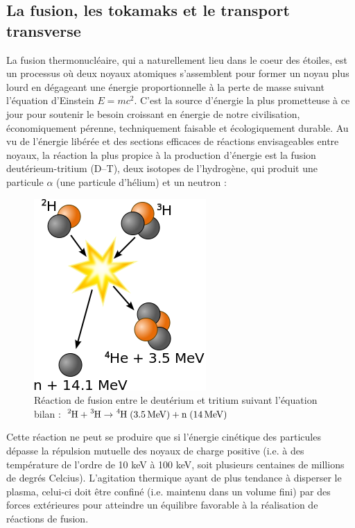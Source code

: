 \label{AnnexeA}
\begin{refsection}

\section*{La fusion, les tokamaks et le transport transverse}

La fusion thermonucléaire, qui a naturellement lieu dans le coeur des étoiles,
est un processus où deux noyaux atomiques s'assemblent pour former un noyau
plus lourd en dégageant une énergie proportionnelle à la perte de masse suivant
l'équation d'Einstein $E=mc^2$. C'est la source d'énergie la plus prometteuse
à ce jour pour soutenir le besoin croissant en énergie de notre civilisation,
économiquement pérenne, techniquement faisable et écologiquement durable.
Au vu de l'énergie libérée et des sections efficaces de réactions envisageables
entre noyaux, la réaction la plus propice à la production d'énergie est la
fusion deutérieum-tritium (D--T), deux isotopes de l'hydrogène, qui produit une
particule $\alpha$ (une particule d'hélium) et un neutron :
\begin{figure}[!htbp]
    \centering
	\includegraphics[height=0.5\textwidth]{figures/1-fusion.png}
	\caption{Réaction
de fusion entre le deutérium et tritium suivant l'équation
bilan : $\ce{^2\text{H}}+\ce{^3\text{H}} \rightarrow
\ce{^4\text{H}}\;(3.5\,\text{MeV})+\text{n}\;(14\,\text{MeV})$}\label{fusionDT}
\end{figure}

Cette réaction ne peut se produire que si l'énergie cinétique des particules
dépasse la répulsion mutuelle des noyaux de charge positive (i.e. à des
température de l'ordre de 10 keV à 100 keV, soit plusieurs centaines de
millions de degrés Celcius). L'agitation thermique ayant de plus tendance à
disperser le plasma, celui-ci doit être confiné (i.e. maintenu dans un volume
fini) par des forces extérieures pour atteindre un équilibre favorable à la
réalisation de réactions de fusion.


\end{refsection}
